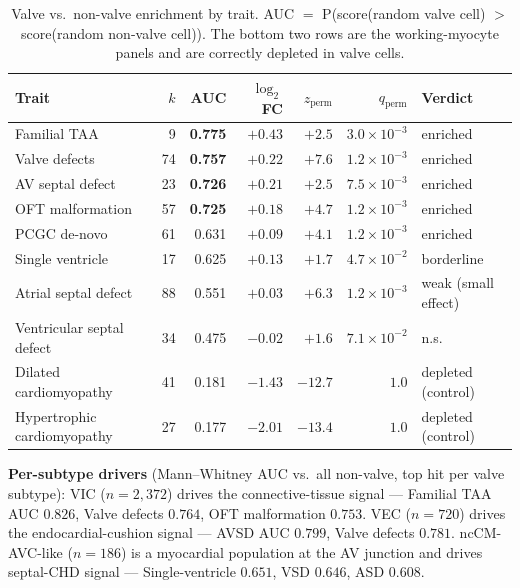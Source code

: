 \documentclass[11pt,a4paper]{article}
\begin{document}
\begin{table}[H]
    \centering\small
    \begin{tabularx}{\linewidth}{@{}l r r r r r Y@{}}
        \toprule
        \textbf{Trait} & \textbf{$k$} & \textbf{AUC} & \textbf{$\log_2$FC} & \textbf{$z_{\text{perm}}$} & \textbf{$q_{\text{perm}}$} & \textbf{Verdict} \\
        \midrule
        Familial TAA                & 9  & \textbf{0.775} & $+0.43$ & $+2.5$ & $3.0\!\times\!10^{-3}$ & enriched \\
        Valve defects               & 74 & \textbf{0.757} & $+0.22$ & $+7.6$ & $1.2\!\times\!10^{-3}$ & enriched \\
        AV septal defect            & 23 & \textbf{0.726} & $+0.21$ & $+2.5$ & $7.5\!\times\!10^{-3}$ & enriched \\
        OFT malformation            & 57 & \textbf{0.725} & $+0.18$ & $+4.7$ & $1.2\!\times\!10^{-3}$ & enriched \\
        PCGC de-novo                & 61 & 0.631 & $+0.09$ & $+4.1$ & $1.2\!\times\!10^{-3}$ & enriched \\
        Single ventricle            & 17 & 0.625 & $+0.13$ & $+1.7$ & $4.7\!\times\!10^{-2}$ & borderline \\
        Atrial septal defect        & 88 & 0.551 & $+0.03$ & $+6.3$ & $1.2\!\times\!10^{-3}$ & weak (small effect) \\
        Ventricular septal defect   & 34 & 0.475 & $-0.02$ & $+1.6$ & $7.1\!\times\!10^{-2}$ & n.s. \\
        Dilated cardiomyopathy      & 41 & 0.181 & $-1.43$ & $-12.7$ & $1.0$ & depleted (control) \\
        Hypertrophic cardiomyopathy & 27 & 0.177 & $-2.01$ & $-13.4$ & $1.0$ & depleted (control) \\
        \bottomrule
    \end{tabularx}
    \caption{Valve vs.\ non-valve enrichment by trait. AUC $=$
    P(score(random valve cell) $>$ score(random non-valve cell)).
    The bottom two rows are the working-myocyte panels and are
    correctly depleted in valve cells.}
    \label{tab:stats}
\end{table}

\textbf{Per-subtype drivers} (Mann--Whitney AUC vs.\ all non-valve, top
hit per valve subtype): VIC ($n=2{,}372$) drives the connective-tissue
signal --- Familial TAA AUC $0.826$, Valve defects $0.764$, OFT
malformation $0.753$. VEC ($n=720$) drives the endocardial-cushion
signal --- AVSD AUC $0.799$, Valve defects $0.781$.
ncCM-AVC-like ($n=186$) is a myocardial population at the AV junction
and drives septal-CHD signal --- Single-ventricle $0.651$, VSD $0.646$,
ASD $0.608$.
\end{document}
